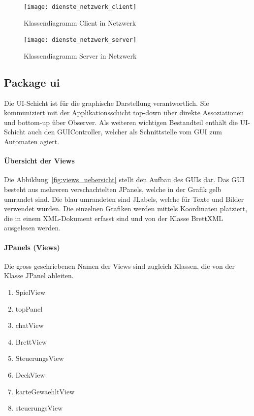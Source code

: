 \documentclass[12pt,halfparskip]{scrartcl}
\begin{document}
\begin{figure}[H]
	\centering
	\texttt{[image: dienste\_netzwerk\_client]}
	\caption{Klassendiagramm Client in Netzwerk}
	\label{fig:dienste_netzwerk_client}
\end{figure}

\begin{figure}[H]
	\centering
	\texttt{[image: dienste\_netzwerk\_server]}
	\caption{Klassendiagramm Server in Netzwerk}
	\label{fig:dienste_netzwerk_server}
\end{figure}

\clearpage
\subsection{Package ui}

Die UI-Schicht ist für die graphische Darstellung verantwortlich. Sie kommuniziert mit der Applikationsschicht top-down über direkte Assoziationen und bottom-up über Observer. Als weiteren wichtigen Bestandteil enthält die UI-Schicht auch den GUIController, welcher als Schnittstelle vom GUI zum Automaten agiert.

\paragraph{Übersicht der Views}
Die Abbildung~\vref{fig:views_uebersicht} stellt den Aufbau des GUIs dar. Das GUI besteht aus mehreren verschachtelten JPanels, welche in der Grafik gelb umrandet sind. Die blau umrandeten sind JLabels, welche für Texte und  Bilder verwendet wurden. Die einzelnen Grafiken werden mittels Koordinaten platziert, die in einem XML-Dokument erfasst sind und von der Klasse BrettXML ausgelesen werden.

\paragraph{JPanels (Views)}
Die gross geschriebenen Namen der Views sind zugleich Klassen, die von der Klasse JPanel ableiten.
\begin{enumerate}
	\item SpielView
	\item topPanel
	\item chatView
	\item BrettView
	\item SteuerungsView
	\item DeckView
	\item karteGewaehltView
	\item steuerungsView
\end{enumerate}
\end{document}
